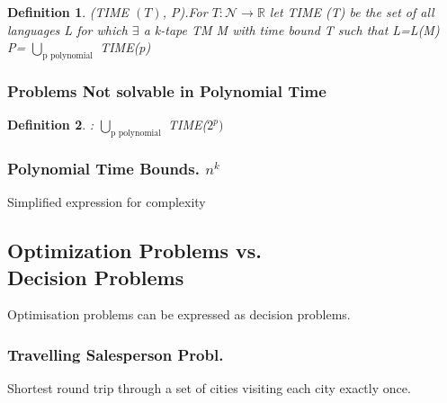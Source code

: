 \documentclass[a3paper, 8pt]{extarticle}
\newtheorem*{definition}{Definition}
\begin{document}
\begin{multicols*}{6}
\begin{definition}
    \textsc{(TIME $(T)$, P)}.For $T: \mathcal{N} \to \mathbb{R}$ let \textsc{TIME} (T) be the set of all languages L for which $\exists$ a k-tape TM M with time bound T such that L=L(M)\\
    P= $\underset{\text{p polynomial}}{\bigcup}$ TIME(p)
\end{definition}



\subsubsection{Problems Not solvable in Polynomial Time}
\begin{definition}
    : $\underset{\text{p polynomial}}{\bigcup}$ TIME($2^p)$
\end{definition}

\subsubsection{Polynomial Time Bounds. $n^k$}
Simplified expression for complexity

\subsection{Optimization Problems vs.\\ Decision Problems}
Optimisation problems can be expressed as decision problems.

\subsubsection{Travelling Salesperson Probl.}
Shortest round trip through a set of cities visiting each city exactly once.


\end{multicols*}
\end{document}

